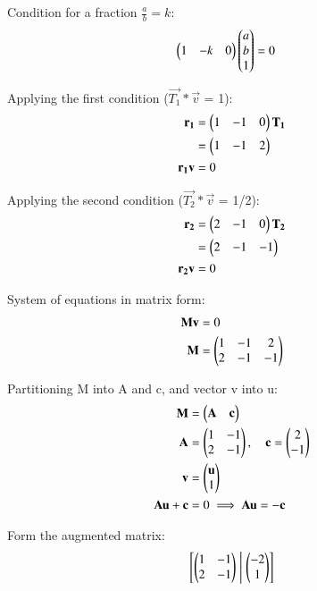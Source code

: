 \documentclass[journal]{IEEEtran}
\begin{document}
Condition for a fraction $\frac{a}{b}=k$:
\begin{align}
\begin{pmatrix}1 & -k & 0\end{pmatrix} \begin{pmatrix}a \\ b \\ 1\end{pmatrix} &= 0
\end{align}

Applying the first condition ($\vec{T_1}*\vec{v}$ = 1):
\begin{align}
\mathbf{r_1} &= \begin{pmatrix}1 & -1 & 0\end{pmatrix} \mathbf{T_1} \\
    &= \begin{pmatrix}1 & -1 & 2\end{pmatrix} \\
\mathbf{r_1} \mathbf{v} &= 0
\end{align}


Applying the second condition ($\vec{T_2}*\vec{v}$ = 1/2):
\begin{align}
\mathbf{r_2} &= \begin{pmatrix}2 & -1 & 0\end{pmatrix} \mathbf{\mathbf{T_2}} \\
    &= \begin{pmatrix}2 & -1 & -1\end{pmatrix} \\
\mathbf{r_2} \mathbf{v} &= 0
\end{align}

System of equations in matrix form:
\begin{align}
\mathbf{M} \mathbf{v} &= 0 \\
\mathbf{M} &= \begin{pmatrix}1 & -1 & 2 \\ 2 & -1 & -1\end{pmatrix}
\end{align}




Partitioning M into A and c, and vector v into u:
\begin{align}
\mathbf{M} &= \begin{pmatrix}\mathbf{A} & \mathbf{c}\end{pmatrix} \\
\mathbf{A} &= \begin{pmatrix}1 & -1 \\ 2 & -1\end{pmatrix}, \quad \mathbf{c} = \begin{pmatrix}2 \\ -1\end{pmatrix} \\
\mathbf{v} &= \begin{pmatrix}\mathbf{u} \\ 1\end{pmatrix} \\
\mathbf{A} \mathbf{u} + \mathbf{c} &= 0 \implies \mathbf{A} \mathbf{u} = -\mathbf{c}
\end{align}



Form the augmented matrix:
\begin{align}
\left[\begin{pmatrix}1 & -1 \\ 2 & -1\end{pmatrix} \;\middle|\; \begin{pmatrix}-2 \\ 1\end{pmatrix}\right]
\end{align}
\end{document}
